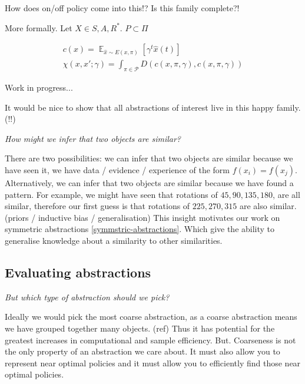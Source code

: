 
{\color{red}How does on/off policy come into this!? Is this family complete?!}

More formally. Let $X \in {S, A, R}^{* }$. $P \subset \Pi$

\begin{align*}
c(x) = \mathop{\mathbb E}_{\hat x \sim E(x, \pi)} [\gamma^t \hat x(t)] \\
\chi(x, x'; \gamma) = \int_{\pi \in \mathcal P} D(c(x, \pi, \gamma), c(x, \pi, \gamma))
\end{align*}

{\color{red}Work in progress...}

It would be nice to show that all abstractions of interest live in this happy family. (!!)

\vspace{5mm}

\begin{displayquote}
	\textit{How might we infer that two objects are similar?}
\end{displayquote}

There are two possibilities: we can infer that two objects are similar because we have seen it,
we have data / evidence / experience of the form $f(x_i) = f(x_j)$.
Alternatively, we can infer that two objects are similar because we have found a pattern.
For example, we might have seen that rotations of $45, 90, 135, 180$, are all similar, therefore our first guess
is that rotations of $225, 270, 315$ are also similar. (priors / inductive bias / generalisation)
This insight motivates our work on symmetric abstractions \ref{symmstric-abstractions}.
Which give the ability to generalise knowledge about a similarity to other similarities.


\subsection{Evaluating abstractions}

\begin{displayquote}
\textit{But which type of abstraction should we pick?}
\end{displayquote}

Ideally we would pick the most coarse abstraction, as a coarse abstraction means we have grouped together many objects. (ref)
Thus it has potential for the greatest increases in computational and sample efficiency.
But. Coarseness is not the only property of an abstraction we care about.
It must also allow you to represent near optimal policies and it must allow you
to efficiently find those near optimal policies.

